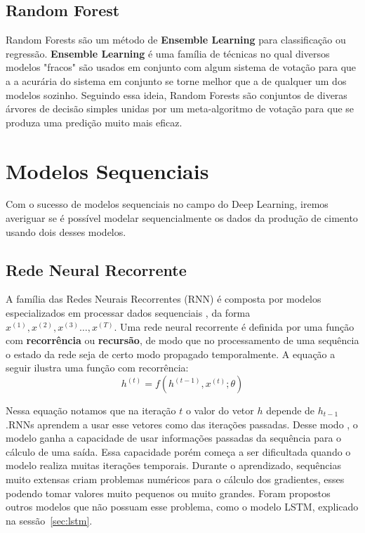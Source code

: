 \subsection{Random Forest}

Random Forests são um método de \textbf{Ensemble Learning} para classificação ou regressão. \textbf{Ensemble Learning} é uma família de técnicas no qual diversos modelos "fracos" são usados em conjunto com algum sistema de votação para que a a acurária do sistema em conjunto se torne melhor que a de qualquer um dos modelos sozinho. Seguindo essa ideia, Random Forests são conjuntos de diveras árvores de decisão simples unidas por um meta-algoritmo de votação para que se produza uma predição muito mais eficaz.


\section{Modelos Sequenciais}
Com o sucesso de modelos sequenciais no campo do Deep Learning, iremos averiguar se é possível modelar sequencialmente os dados da produção de cimento usando dois desses modelos. 
\\

\subsection{Rede Neural Recorrente}
% 

A família das Redes Neurais Recorrentes (RNN) é composta por modelos especializados
em processar dados sequenciais \citep{dlbook}, da forma $x^{(1)},x^{(2)} ,x^{(3)}\dots ,x^{(T)}$. Uma rede neural recorrente é definida por uma função com
\textbf{recorrência} ou \textbf{recursão}, de modo que no processamento de uma
sequência o estado da rede seja de certo modo propagado temporalmente. A equação
a seguir ilustra uma função com recorrência: \\

\[h^{(t)} = f(h^{(t-1)},x^{(t)};\theta)\]

Nessa equação notamos que na iteração $t$ o valor do vetor $h$ depende de
$h_{t-1}$.RNNs aprendem a usar esse vetores como
 das iterações passadas. Desse modo , o modelo ganha a capacidade
de usar informações passadas da sequência para o cálculo
de uma saída. Essa capacidade porém começa a ser dificultada quando o modelo
realiza muitas iterações temporais. Durante o aprendizado, sequências muito
extensas criam problemas numéricos para o cálculo dos gradientes, esses podendo
tomar valores muito pequenos ou muito grandes. Foram propostos outros modelos
que não possuam esse problema, como o modelo LSTM, explicado na sessão~\ref{sec:lstm}. 

